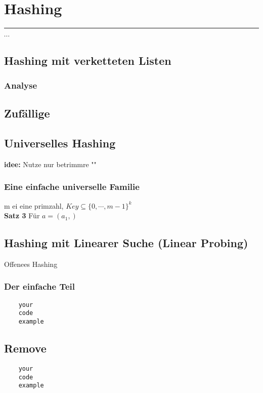 

\section{Hashing}
\rule{\textwidth}{0.4pt}

$\cdots$

\subsection{Hashing mit verketteten Listen}
\subsubsection*{Analyse}
\subsection*{Zufällige }
\subsection{Universelles Hashing}
\textbf{idee:} Nutze nur betrimmre ""
\subsubsection*{Eine einfache universelle Familie}
m ei eine primzahl, $Key \subseteq \{0, \cdots, m - 1\}^k$ \\ \textbf{Satz 3} Für $a = (a_1, )$

\subsubsection*{}
\subsection{Hashing mit Linearer Suche (Linear Probing)} Offenees Hashing
\subsubsection*{Der einfache Teil}
\begin{verbatim}
    your
    code
    example
\end{verbatim}

\subsection*{Remove}
\begin{verbatim}
    your
    code
    example
\end{verbatim}

